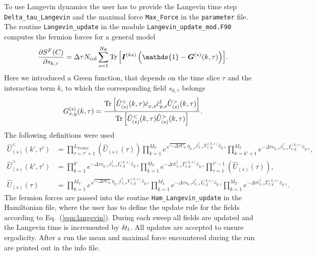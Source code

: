 To use Langevin dynamics the user has to provide the Langevin time step \texttt{Delta\_tau\_Langevin} and the maximal force \texttt{Max\_Force} in the \texttt{parameter} file. The routine  \texttt{Langevin\_update} in the module \texttt{Langevin\_update\_mod.F90}   computes the fermion forces  for a  general model
\begin{equation}
 \frac { \partial S^F(C)}{\partial s_{k,\tau} } 
 	= \Delta \tau {N_{\mathrm{col}}} \sum\limits_{s=1}^{N_{\mathrm{fl}}} \Tr{\left[ \bm{I}^{(ks)}\left(\mathds{1} - \bm{G}^{(s)}(k,\tau) \right) \right]} .
\end{equation}
Here we introduced a Green function, that depends on the time slice $\tau$  and the interaction term $k$, to which the corresponding field $s_{k,\tau}$ belongs 
\begin{equation}
G_{x,y}^{(s)}(k,\tau) = \frac{\Tr{\left[ \hat{U}_{(s)}^{<}(k,\tau) \hat{c}_{x,s}^{\phantom\dagger} \hat{c}_{y,s}^{\dagger} \hat{U}_{(s)}^{>}(k,\tau) \right]} }
{\Tr{\left[ \hat{U}_{(s)}^{<}(k,\tau)\hat{U}_{(s)}^{>}(k,\tau) \right]}}.
\end{equation}
The following definitions were used
\begin{align}
 \hat{U}_{(s)}^{<}(k',\tau') &= \prod_{\tau=\tau'+1}^{L_{\text{Trotter}}}  \left( \hat{U}_{(s)}(\tau) \right)
  \prod_{k=1}^{M_V} e^{\sqrt{-\Delta\tau U_k}  \eta_{k,\tau'} \hat{c}_{x,s}^{\dagger} V_{x,y}^{(k,s)} \hat{c}_{y,s}^{\phantom\dagger}}
\prod_{k=k'+1}^{M_I} e^{-\Delta\tau s_{k,\tau'} \hat{c}_{x,s}^{\dagger} I_{x,y}^{(k,s)} \hat{c}_{y,s}^{\phantom\dagger}}, \\
 \hat{U}_{(s)}^{>}(k',\tau') &= \prod_{k=1}^{k'} e^{-\Delta \tau s_{k,\tau'}  \hat{c}_{x,s}^{\dagger} I_{x,y}^{(k,s)} \hat{c}_{y,s}^{\phantom\dagger}}
  \prod_{k=1}^{M_T}   e^{-\Delta\tau  \hat{c}_{x,s}^{\dagger} T_{x,y}^{(k,s)} \hat{c}_{y,s}^{\phantom\dagger}} 
  \prod_{\tau=1}^{\tau'-1}  \left( \hat{U}_{(s)}(\tau) \right), \\
  \hat{U}_{(s)}(\tau) &= \prod_{k=1}^{M_V} e^{\sqrt{-\Delta\tau U_k}  \eta_{k,\tau} \hat{c}_{x,s}^{\dagger} V_{x,y}^{(k,s)} \hat{c}_{y,s}^{\phantom\dagger}} 
  \prod_{k=1}^{M_I} e^{-\Delta\tau s_{k,\tau} \hat{c}_{x,s}^{\dagger} I_{x,y}^{(k,s)} \hat{c}_{y,s}^{\phantom\dagger}}
    \prod_{k=1}^{M_T}   e^{-\Delta\tau  \hat{c}_{x,s}^{\dagger} T_{x,y}^{(k,s)} \hat{c}_{y,s}^{\phantom\dagger}} .
\end{align}
 The fermion forces are passed into the routine \texttt{Ham\_Langevin\_update} in the Hamiltonian file, where the user has to define the update rule for the fields according to Eq.~(\ref{eqn:langevin}). During each sweep all fields are updated and the Langevin time is incremented by $\delta t_{l}$. All updates are accepted to ensure ergodicity. After a run the mean and maximal force encountered during the run are printed out in the info file. 

